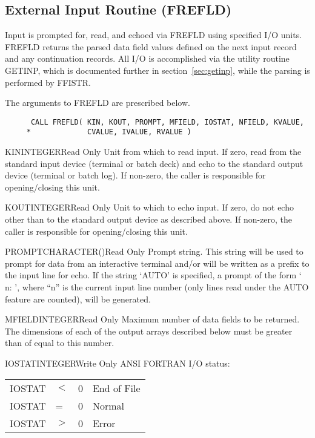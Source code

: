 \subsection{External Input Routine (FREFLD)}\label{sec:frefld}

Input is prompted for, read, and echoed via FREFLD
using specified I/O units.  FREFLD returns the parsed data field values
defined on the next input record and any continuation records.  All I/O is
accomplished via the utility routine GETINP, which is documented further in
section~\ref{sec:getinp}, while the parsing is performed by FFISTR.

The arguments to FREFLD are prescribed below.
\begin{verbatim}
      CALL FREFLD( KIN, KOUT, PROMPT, MFIELD, IOSTAT, NFIELD, KVALUE,
     *             CVALUE, IVALUE, RVALUE )
\end{verbatim}

\begin{argy}{KIN}{INTEGER}{Read Only}
Unit from which to read input.  If zero, read from the
standard input device (terminal or batch deck) and echo
to the standard output device (terminal or batch log).
If non-zero, the caller is responsible for opening/closing this unit.
\end{argy}

\begin{argy}{KOUT}{INTEGER}{Read Only}
Unit to which to echo input.  If zero, do not echo other
than to the standard output device as described above.
If non-zero, the caller is responsible for opening/closing this unit.
\end{argy}

\begin{argy}{PROMPT}{CHARACTER\last(\last)}{Read Only}
Prompt string.  This string will be used to prompt for
data from an interactive terminal and/or will be written
as a prefix to the input line for echo.  If the string
`AUTO' is specified, a prompt of the form `   n: ',
where ``n'' is the current input line number (only lines
read under the AUTO feature are counted), will be
generated.
\end{argy}

\begin{argy}{MFIELD}{INTEGER}{Read Only}
Maximum number of data fields to be returned.
The dimensions of each of the output
arrays described below must be greater than of equal to this number.
\end{argy}

\begin{argy}{IOSTAT}{INTEGER}{Write Only}
ANSI FORTRAN I/O status:\\
\begin{tabular}{llll}
IOSTAT &$<$ & 0 & End of File\\
IOSTAT & =  & 0 & Normal\\
IOSTAT &$>$ & 0 & Error
\end{tabular}
\end{argy}

